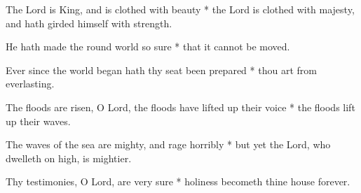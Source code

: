 
The Lord is King, and is clothed with beauty * the Lord is clothed with majesty, and hath girded himself with strength.

He hath made the round world so sure * that it cannot be moved.

Ever since the world began hath thy seat been prepared * thou art from everlasting.

The floods are risen, O Lord, the floods have lifted up their voice * the floods lift up their waves.

The waves of the sea are mighty, and rage horribly * but yet the Lord, who dwelleth on high, is mightier.

Thy testimonies, O Lord, are very sure * holiness becometh thine house forever.